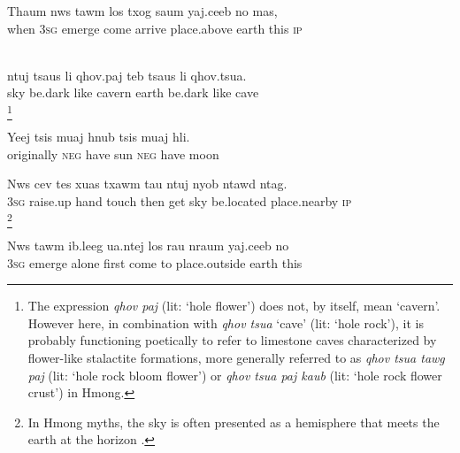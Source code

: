 \documentclass[output=paper]{LSP/langsci}
\begin{document}
 \begin{exe}
 \label{JaexApp6}
\gll Thaum nws tawm los txog saum yaj.ceeb no mas,\\
  when \textsc{3sg} emerge come arrive place.above earth this \textsc{ip}\\
\glt {}\\
\end{exe}


 \begin{exe}
 \label{JaexApp7}
\gll ntuj tsaus li qhov.paj teb tsaus li qhov.tsua.\\
     sky be.dark like cavern earth be.dark like cave\\
\glt {}\footnote{The expression \textit{qhov paj} (lit: `hole flower') does not, by itself, mean `cavern'. However here, in combination with \textit{qhov tsua} `cave' (lit: `hole rock'), it is probably functioning poetically to refer to limestone caves characterized by flower-like stalactite formations, more generally referred to as \textit{qhov tsua tawg paj} (lit: `hole rock bloom flower') or \textit{qhov tsua paj kaub} (lit: `hole rock flower crust') in Hmong.} 
\end{exe} 
 
 \begin{exe}
 \label{JaexApp8}
\gll Yeej tsis muaj hnub tsis muaj hli.\\
     originally \textsc{neg} have sun \textsc{neg} have moon\\
\glt {}
\end{exe}

\begin{exe}
 \label{JaexApp9}
\gll Nws cev tes xuas txawm tau ntuj nyob ntawd ntag.\\
     \textsc{3sg} raise.up hand touch then get sky be.located place.nearby \textsc{ip}\\
\glt  {}\footnote{In Hmong myths, the sky is often presented as a hemisphere that meets the earth at the horizon \citep[][14, fn.2]{johnson92}.}
\end{exe}

\begin{exe}
 \label{JaexApp10}
\gll Nws tawm ib.leeg ua.ntej los rau nraum yaj.ceeb no\\
     \textsc{3sg} emerge alone first come to place.outside earth this\\
\glt  {}
\end{exe}
\end{document}
